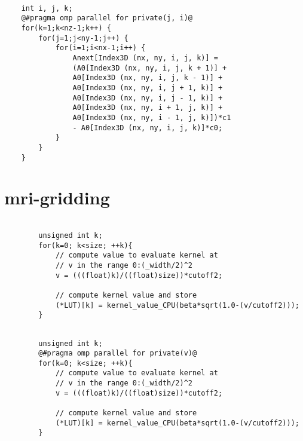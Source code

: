 \documentclass[10pt,a4paper]{report}
\begin{document}
\begin{lstlisting}[caption=Our parallel source code for stencil,style=base]
	
	int i, j, k;	
	@#pragma omp parallel for private(j, i)@
	for(k=1;k<nz-1;k++) {
		for(j=1;j<ny-1;j++) {
			for(i=1;i<nx-1;i++) {
				Anext[Index3D (nx, ny, i, j, k)] = 
				(A0[Index3D (nx, ny, i, j, k + 1)] +
				A0[Index3D (nx, ny, i, j, k - 1)] +
				A0[Index3D (nx, ny, i, j + 1, k)] +
				A0[Index3D (nx, ny, i, j - 1, k)] +
				A0[Index3D (nx, ny, i + 1, j, k)] +
				A0[Index3D (nx, ny, i - 1, j, k)])*c1
				- A0[Index3D (nx, ny, i, j, k)]*c0;
			}
		}
	}
\end{lstlisting}

\newpage
\section{mri-gridding}

\begin{center}
\begin{minipage}{.48\textwidth}
\begin{lstlisting}[caption=Auxiliary function source code for sequential mri-gridding,style=base]

		unsigned int k;
		for(k=0; k<size; ++k){
			// compute value to evaluate kernel at
			// v in the range 0:(_width/2)^2
			v = (((float)k)/((float)size))*cutoff2;

			// compute kernel value and store
			(*LUT)[k] = kernel_value_CPU(beta*sqrt(1.0-(v/cutoff2)));
		}
\end{lstlisting}
\end{minipage}
\hfill
\begin{minipage}{.48\textwidth}
\begin{lstlisting}[caption=Auxiliary function source code for parallel mri-gridding,style=base]

		unsigned int k;
		@#pragma omp parallel for private(v)@
		for(k=0; k<size; ++k){
			// compute value to evaluate kernel at
			// v in the range 0:(_width/2)^2
			v = (((float)k)/((float)size))*cutoff2;

			// compute kernel value and store
			(*LUT)[k] = kernel_value_CPU(beta*sqrt(1.0-(v/cutoff2)));
		}
\end{lstlisting}
\end{minipage}
\end{center}
\end{document}
